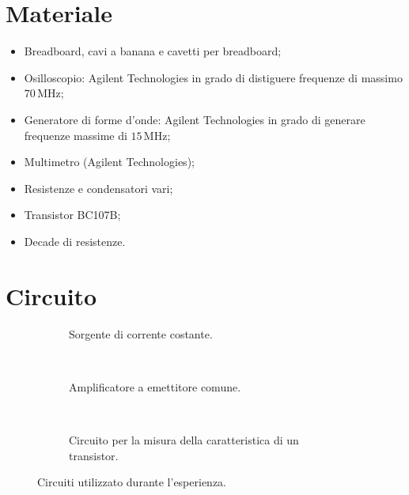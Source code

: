 \section*{Materiale}

\begin{itemize}
    \setlength{\itemsep}{0pt}
    \item{Breadboard, cavi a banana e cavetti per breadboard;}
    \item{Osilloscopio: Agilent Technologies in grado di distiguere frequenze di massimo $70\,\si{\mega\hertz}$;}
    \item{Generatore di forme d'onde: Agilent Technologies in grado di generare frequenze massime di $15\,\si{\mega\hertz}$;}
    \item{Multimetro (Agilent Technologies);}
    \item{Resistenze e condensatori vari;}
    \item{Transistor BC107B;}
    \item{Decade di resistenze.}
\end{itemize}

\section*{Circuito}

\begin{figure}[h]
	\small
        \centering
        \begin{subfigure}[b]{0.2\textwidth}
		\def\svgwidth{\columnwidth}
		
                \caption{Sorgente di corrente costante.}
                \label{fig:corr_cost}
        \end{subfigure}
        ~
	\begin{subfigure}[b]{0.3\textwidth}
		\def\svgwidth{\columnwidth}
		
                \caption{Amplificatore a emettitore comune.}
                \label{fig:ampli}
        \end{subfigure}
        ~
       \begin{subfigure}[b]{0.4\textwidth}
		\def\svgwidth{\columnwidth}
		
                \caption{Circuito per la misura della caratteristica di un transistor.}
                \label{fig:transistor}
        \end{subfigure}
        \caption{Circuiti utilizzato durante l’esperienza.}
	\label{fig:circuiti}
\end{figure}
